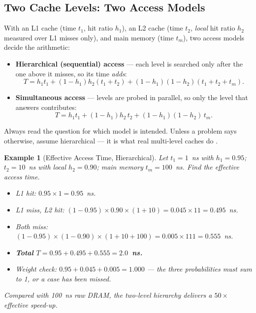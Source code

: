 \documentclass[11pt]{article}
\newtheorem{example}{Example}[section]
\begin{document}
\subsection{Two Cache Levels: Two Access Models}

With an L1 cache (time $t_1$, hit ratio $h_1$), an L2 cache (time $t_2$, \emph{local} hit ratio $h_2$ measured over L1 misses only), and main memory (time $t_m$), two access models decide the arithmetic:

\begin{itemize}
  \item \textbf{Hierarchical (sequential) access} --- each level is searched only after the one above it misses, so its time \emph{adds}:
    \[ T = h_1 t_1 + (1-h_1)h_2(t_1+t_2) + (1-h_1)(1-h_2)(t_1+t_2+t_m). \]
  \item \textbf{Simultaneous access} --- levels are probed in parallel, so only the level that answers contributes:
    \[ T = h_1 t_1 + (1-h_1)h_2\,t_2 + (1-h_1)(1-h_2)\,t_m. \]
\end{itemize}

Always read the question for which model is intended. Unless a problem says otherwise, assume hierarchical --- it is what real multi-level caches do \cite[\S5.2 Number of Caches, PDF pp.~205--208]{Stallings2015_computer_organization}.

\begin{example}[Effective Access Time, Hierarchical]
\label{ex:multi-hier}
Let $t_1 = 1$~ns with $h_1 = 0.95$; $t_2 = 10$~ns with local $h_2 = 0.90$; main memory $t_m = 100$~ns. Find the effective access time.

\begin{itemize}
  \item L1 hit: $0.95 \times 1 = 0.95$~ns.
  \item L1 miss, L2 hit: $(1-0.95)\times 0.90 \times (1+10) = 0.045 \times 11 = 0.495$~ns.
  \item Both miss: $(1-0.95)\times(1-0.90) \times (1+10+100) = 0.005 \times 111 = 0.555$~ns.
  \item \textbf{Total $T = 0.95 + 0.495 + 0.555 = 2.0$~ns.}
  \item Weight check: $0.95 + 0.045 + 0.005 = 1.000$ --- the three probabilities must sum to 1, or a case has been missed.
\end{itemize}

Compared with 100~ns raw DRAM, the two-level hierarchy delivers a $50\times$ effective speed-up.
\end{example}
\end{document}

